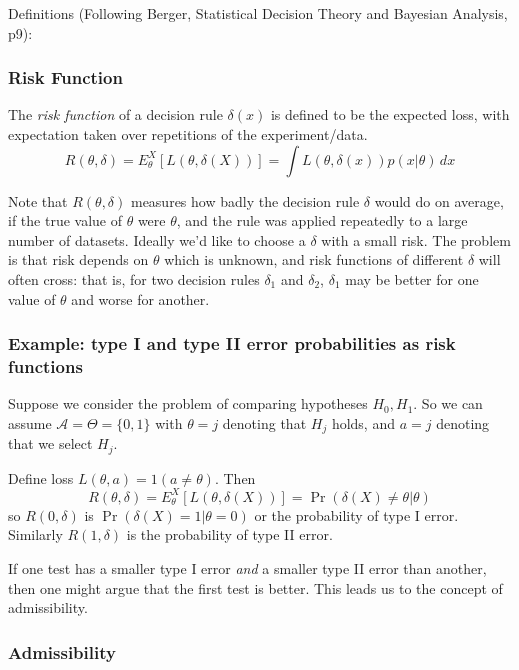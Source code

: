 \documentclass[12pt]{article}
\def\A{\mathcal A}
\begin{document}
Definitions (Following Berger, Statistical Decision Theory and Bayesian Analysis, p9):

\subsubsection{Risk Function}

The {\it risk function} of a decision rule $\delta(x)$ is defined to be the expected loss, with expectation taken over repetitions of the experiment/data.
\begin{equation}
R(\theta,\delta) = E_\theta^X[L(\theta,\delta(X))] = \int L(\theta,\delta(x)) p(x|\theta) \, dx 
\end{equation}

Note that $R(\theta,\delta)$ measures how badly the decision rule $\delta$ would do on average, if the true value of $\theta$ were $\theta$, and the rule
was applied repeatedly to a large number of datasets.
Ideally we'd like to choose a $\delta$ with a small risk. The problem is
that risk depends on $\theta$ which is unknown, and risk functions of different $\delta$ will often cross: that is, for two decision rules $\delta_1$ and $\delta_2$, $\delta_1$ may be better for one value of
$\theta$ and worse for another.

\subsubsection*{Example: type I and type II error probabilities as risk functions}

Suppose we consider the problem of comparing hypotheses $H_0,H_1$. 
So we can assume $\A= \Theta = \{0,1\}$ with $\theta=j$ denoting that $H_j$ holds,
and $a=j$ denoting that we select $H_j$.

Define loss $L(\theta,a) = 1(a \neq \theta)$. Then 
\begin{equation}
R(\theta,\delta) = E_\theta^X[L(\theta,\delta(X))] = \Pr(\delta(X) \neq \theta | \theta)
\end{equation}
so $R(0,\delta)$ is $\Pr(\delta(X) =1 | \theta=0)$ or the probability of type I error.
Similarly $R(1,\delta)$ is the probability of type II error.

If one test has a smaller type I error {\it and} a smaller type II error than another, then one might
argue that the first test is better. This leads us to the concept of admissibility.

\subsubsection{Admissibility}
\end{document}
